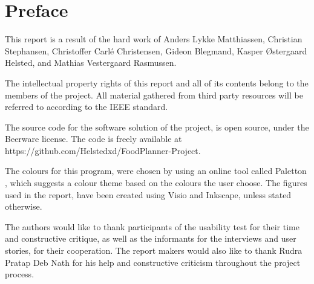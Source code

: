 \chapter*{Preface} \label{PrefaceLabel}

This report is a result of the hard work of Anders Lykke Matthiassen, Christian Stephansen, Christoffer Carlé Christensen, Gideon Blegmand, Kasper Østergaard Helsted, and Mathias Vestergaard Rasmussen.

The intellectual property rights of this report and all of its contents belong to the members of the project. All material gathered from third party resources will be referred to according to the IEEE standard.

The source code for the software solution of the project, is open source, under the Beerware license. The code is freely available at https://github.com/Helstedxd/FoodPlanner-Project.

The colours for this program, were chosen by using an online tool called Paletton \cite{paletton}, which suggests a colour theme based on the colours the user choose. The figures used in the report, have been created using Visio and Inkscape, unless stated otherwise.

The authors would like to thank participants of the usability test for their time and constructive critique, as well as the informants for the interviews and user stories, for their cooperation. The report makers would also like to thank Rudra Pratap Deb Nath for his help and constructive criticism throughout the project process.

\begin{multicols}{2}
\signature{Anders Lykke Matthiassen}
\signature{Christian Stephansen}
\signature{Christoffer Carlé Christensen}
\signature{Gideon Blegmand}
\signature{Kasper Østergaard Helsted}
\signature{Mathias Vestergaard Rasmussen}
\end{multicols}